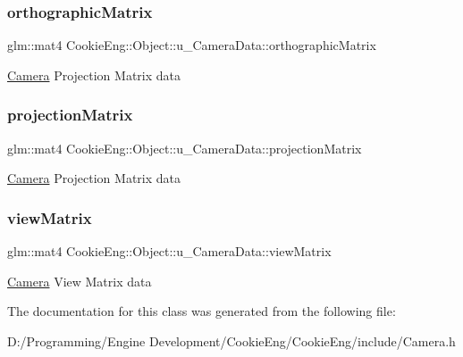 \subsubsection{\texorpdfstring{orthographic\+Matrix}{orthographicMatrix}}
{\footnotesize\ttfamily glm\+::mat4 Cookie\+Eng\+::\+Object\+::u\+\_\+\+Camera\+Data\+::orthographic\+Matrix}

\hyperlink{class_cookie_eng_1_1_object_1_1_camera}{Camera} Projection Matrix data \mbox{\label{struct_cookie_eng_1_1_object_1_1u___camera_data_ad96d4277fd1ef3111e1ee93353b771d7}} 
\subsubsection{\texorpdfstring{projection\+Matrix}{projectionMatrix}}
{\footnotesize\ttfamily glm\+::mat4 Cookie\+Eng\+::\+Object\+::u\+\_\+\+Camera\+Data\+::projection\+Matrix}

\hyperlink{class_cookie_eng_1_1_object_1_1_camera}{Camera} Projection Matrix data \mbox{\label{struct_cookie_eng_1_1_object_1_1u___camera_data_a1b1b0afdb4ac8c07474be855341516e4}} 
\subsubsection{\texorpdfstring{view\+Matrix}{viewMatrix}}
{\footnotesize\ttfamily glm\+::mat4 Cookie\+Eng\+::\+Object\+::u\+\_\+\+Camera\+Data\+::view\+Matrix}

\hyperlink{class_cookie_eng_1_1_object_1_1_camera}{Camera} View Matrix data 

The documentation for this class was generated from the following file\+:\begin{DoxyCompactItemize}
\item 
D\+:/\+Programming/\+Engine Development/\+Cookie\+Eng/\+Cookie\+Eng/include/Camera.\+h\end{DoxyCompactItemize}

